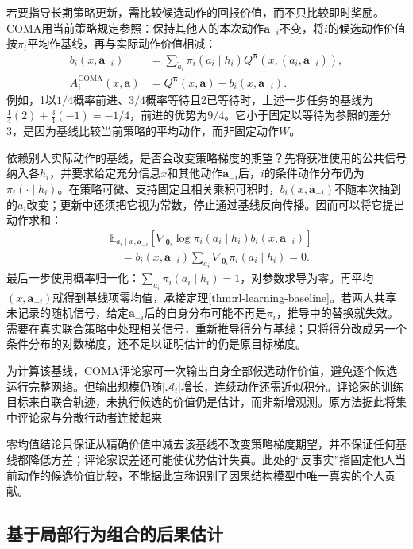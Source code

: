 若要指导长期策略更新，需比较候选动作的回报价值，而不只比较即时奖励。COMA用当前策略规定参照：保持其他人的本次动作$\bm a_{-i}$不变，将$i$的候选动作价值按$\pi_i$平均作基线，再与实际动作价值相减：
\begin{align}
 b_i(x,\bm a_{-i})
 &=\sum_{\tilde a_i}\pi_i(\tilde a_i\mid h_i)
       Q^{\bm\pi}(x,(\tilde a_i,\bm a_{-i})),\\
 A_i^{\text{COMA}}(x,\bm a)
 &=Q^{\bm\pi}(x,\bm a)-b_i(x,\bm a_{-i}).
 \label{eq:rl-multi-agent-coma}
\end{align}
例如，1以$1/4$概率前进、$3/4$概率等待且2已等待时，上述一步任务的基线为
$\tfrac14(2)+\tfrac34(-1)=-1/4$，前进的优势为$9/4$。它小于固定以等待为参照的差分3，是因为基线比较当前策略的平均动作，而非固定动作$W$。

依赖别人实际动作的基线，是否会改变策略梯度的期望？先将获准使用的公共信号纳入各$h_i$，并要求给定充分信息$x$和其他动作$\bm a_{-i}$后，$i$的条件动作分布仍为$\pi_i(\cdot\mid h_i)$。在策略可微、支持固定且相关乘积可积时，$b_i(x,\bm a_{-i})$不随本次抽到的$a_i$改变；更新中还须把它视为常数，停止通过基线反向传播。因而可以将它提出动作求和：
\begin{align}
 &\mathbb E_{a_i\mid x,\bm a_{-i}}
   [\nabla_{\bm\theta_i}\log\pi_i(a_i\mid h_i)b_i(x,\bm a_{-i})]\nonumber\\
 &\quad=b_i(x,\bm a_{-i})
       \sum_{a_i}\nabla_{\bm\theta_i}\pi_i(a_i\mid h_i)=0.
 \label{eq:rl-multi-agent-baseline-zero}
\end{align}
最后一步使用概率归一化：$\sum_{a_i}\pi_i(a_i\mid h_i)=1$，对参数求导为零。再平均$(x,\bm a_{-i})$就得到基线项零均值，承接定理\ref{thm:rl-learning-baseline}。若两人共享未记录的随机信号，给定$\bm a_{-i}$后的自身分布可能不再是$\pi_i$，推导中的替换就失效。需要在真实联合策略中处理相关信号，重新推导得分与基线；只将得分改成另一个条件分布的对数梯度，还不足以证明估计的仍是原目标梯度。

为计算该基线，COMA评论家可一次输出自身全部候选动作价值，避免逐个候选运行完整网络。但输出规模仍随$|\mathcal A_i|$增长，连续动作还需近似积分。评论家的训练目标来自联合轨迹，未执行候选的价值仍是估计，而非新增观测。原方法据此将集中评论家与分散行动者连接起来

零均值结论只保证从精确价值中减去该基线不改变策略梯度期望，并不保证任何基线都降低方差；评论家误差还可能使优势估计失真。此处的“反事实”指固定他人当前动作的候选价值比较，不能据此宣称识别了因果结构模型中唯一真实的个人贡献。

\subsection{基于局部行为组合的后果估计}
\label{sec:rl-multi-agent-factorization}

